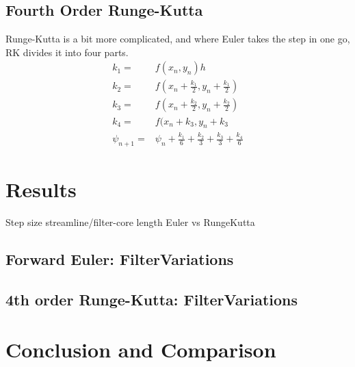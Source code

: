 \documentclass[11pt,a4paper,english]{article}
\numberwithin{equation}{section}
\begin{document}
\subsection{Fourth Order Runge-Kutta}
Runge-Kutta is a bit more complicated, and where Euler takes the step in one go, RK divides it into four parts.
\begin{align*}
	k_1 =& f(x_n, y_n)h	\\
	k_2 =& f(x_n + \frac{k_1}{2}, y_n + \frac{k_1}{2})	\\
	k_3 =& f(x_n + \frac{k_2}{2}, y_n + \frac{k_2}{2})	\\
	k_4 =& f(x_n + k_3, y_n + k_3	\\	
	\psi_{n+1} =& \psi_n + \frac{k_1}{6} + \frac{k_2}{3} + \frac{k_3}{3} + \frac{k_4}{6}
\end{align*}


\section{Results}

Step size
streamline/filter-core length
Euler vs RungeKutta


\subsection{Forward Euler: FilterVariations}


\subsection{4th order Runge-Kutta: FilterVariations}


\section{Conclusion and Comparison}
\end{document}
